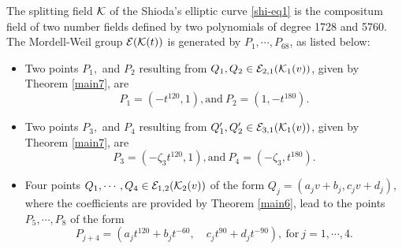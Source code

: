 \documentclass[11pt]{amsart}
\begin{document}
\begin{thm}
	\label{main0}
	The splitting field ${\mathcal K}$ of the Shioda's elliptic curve \eqref{shi-eq1} is the compositum field of two number fields defined by two polynomials of degree 1728 and 5760.
	The Mordell-Weil group ${\mathcal E}({\mathcal K}(t))$ is generated by $P_1,\cdots, P_{68}$, as listed below:
	\begin{itemize}

				\item[(1)] Two points  $P_1,$ and $ P_2$  resulting from $Q_1, Q_2\in {\mathcal E}_{2, 1}({\mathcal K}_1(v))$,  given by Theorem \ref{main7},  are  
			$$P_1=(-t^{120}, 1), \text{and}\
				P_2 = (1,  - t^{180} ).$$
			
				\item[(2)] Two points  $P_{3},$ 
				and $ P_{4}$ resulting from  $Q'_1, Q'_2 \in {\mathcal E}_{3, 1}({\mathcal K}_1(v))$,  given by Theorem \ref{main7},  are 
				$$
			P_3=(-\zeta_3 t^{120}, 1),  \text{and}\
			P_4 =  (-\zeta_3, t^{180}).$$
			
			\item[(3)] Four points    $Q_1, \cdots, Q_4 \in {\mathcal E}_{1, 2}({\mathcal K}_2(v))$ of the form
			 $Q_j=(  a_j v +b_j,      c_j v + d_j  )$,
		where the coefficients are	 provided by Theorem  \ref{main6}, lead  to the points
			$P_5, \cdots, P_8$ of the form
			$$P_{j+4}= (  a_j t^{120} +b_j t^{-60}, \quad    c_j t^{90} + d_j t^{-90}), \  \text{for} \ j=1,\cdots, 4. $$
			
			
			

		

\end{itemize}
\end{thm}
\end{document}
